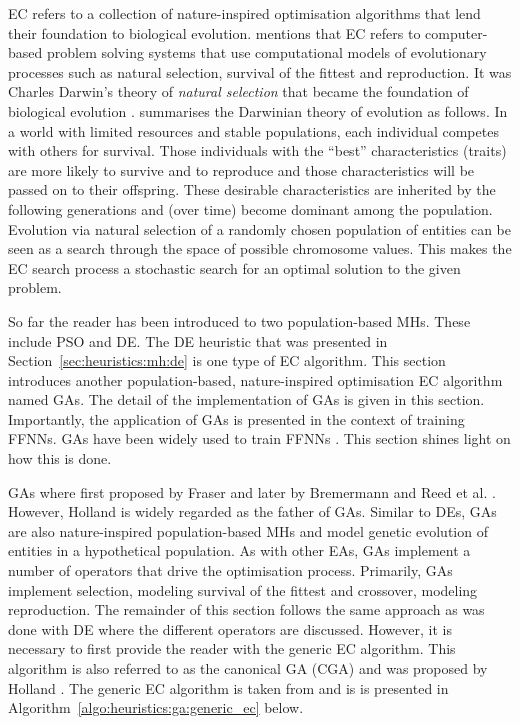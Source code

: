 \Ac{EC} refers to a collection of nature-inspired optimisation algorithms that lend their foundation to biological evolution. \citeauthor{ref:engelbrecht:2007}\cite{ref:engelbrecht:2007} mentions that \ac{EC} refers to computer-based problem solving systems that use computational models of evolutionary processes such as natural selection, survival of the fittest and reproduction. It was Charles Darwin's theory of \textit{natural selection} that became the foundation of biological evolution \cite{ref:darwin:1987}. \citeauthor{ref:engelbrecht:2007}\cite{ref:engelbrecht:2007} summarises the Darwinian theory of evolution \cite{ref:darwin:2012} as follows. In a world with limited resources and stable populations, each individual competes with others for survival. Those individuals with the ``best'' characteristics (traits) are more likely to survive and to reproduce and those characteristics will be passed on to their offspring. These desirable characteristics are inherited by the following generations and (over time) become dominant among the population. Evolution via natural selection of a randomly chosen population of entities can be seen as a search through the space of possible chromosome values. This makes the \ac{EC} search process a stochastic search for an optimal solution to the given problem.

So far the reader has been introduced to two population-based \acp{MH}. These include \ac{PSO} and \ac{DE}. The \ac{DE} heuristic that was presented in Section~\ref{sec:heuristics:mh:de} is one type of \ac{EC} algorithm. This section introduces another population-based, nature-inspired optimisation \ac{EC} algorithm named \aclp{GA}. The detail of the implementation of \acp{GA} is given in this section. Importantly, the application of \acp{GA} is presented in the context of training \acp{FFNN}. \acp{GA} have been widely used to train \acp{FFNN} \cite{ref:montana:1989}\cite{ref:siddique:2001}\cite{ref:miller:1989}. This section shines light on how this is done.

\Acp{GA} where first proposed by Fraser \cite{ref:fraser:1957} and later by Bremermann \cite{ref:bremermann:1962} and Reed et al. \cite{ref:reed:1967}. However, Holland \cite{ref:holland:1992} is widely regarded as the father of \acp{GA}. Similar to \acp{DE}, \acp{GA} are also nature-inspired population-based \acp{MH} and model genetic evolution of entities in a hypothetical population. As with other \acp{EA}, \acp{GA} implement a number of operators that drive the optimisation process.  Primarily, \acp{GA} implement selection, modeling survival of the fittest and crossover, modeling reproduction. The remainder of this section follows the same approach as was done with \ac{DE} where the different operators are discussed. However, it is necessary to first provide the reader with the generic \ac{EC} algorithm. This algorithm is also referred to as the canonical \ac{GA} (CGA) and was proposed by Holland \cite{ref:holland:1992}. The generic \ac{EC} algorithm is taken from \cite{ref:engelbrecht:2007} and is is presented in Algorithm~\ref{algo:heuristics:ga:generic_ec} below.


